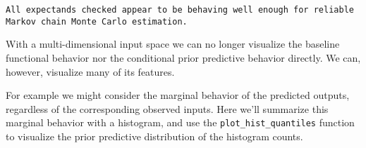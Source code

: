 \documentclass[
  letterpaper,
  DIV=11,
  numbers=noendperiod]{scrartcl}
\newenvironment{Shaded}{\begin{snugshade}}{\end{snugshade}}
\newcommand{\AttributeTok}[1]{\textcolor[rgb]{0.40,0.45,0.13}{#1}}
\newcommand{\ConstantTok}[1]{\textcolor[rgb]{0.56,0.35,0.01}{#1}}
\newcommand{\DecValTok}[1]{\textcolor[rgb]{0.68,0.00,0.00}{#1}}
\newcommand{\FunctionTok}[1]{\textcolor[rgb]{0.28,0.35,0.67}{#1}}
\newcommand{\NormalTok}[1]{\textcolor[rgb]{0.00,0.23,0.31}{#1}}
\newcommand{\OtherTok}[1]{\textcolor[rgb]{0.00,0.23,0.31}{#1}}
\newcommand{\SpecialCharTok}[1]{\textcolor[rgb]{0.37,0.37,0.37}{#1}}
\newcommand{\StringTok}[1]{\textcolor[rgb]{0.13,0.47,0.30}{#1}}
\begin{document}
\begin{Shaded}
\end{Shaded}

\begin{verbatim}
All expectands checked appear to be behaving well enough for reliable
Markov chain Monte Carlo estimation.
\end{verbatim}

With a multi-dimensional input space we can no longer visualize the
baseline functional behavior nor the conditional prior predictive
behavior directly. We can, however, visualize many of its features.

For example we might consider the marginal behavior of the predicted
outputs, regardless of the corresponding observed inputs. Here we'll
summarize this marginal behavior with a histogram, and use the
\texttt{plot\_hist\_quantiles} function to visualize the prior
predictive distribution of the histogram counts.

\begin{Shaded}
\end{Shaded}
\end{document}
